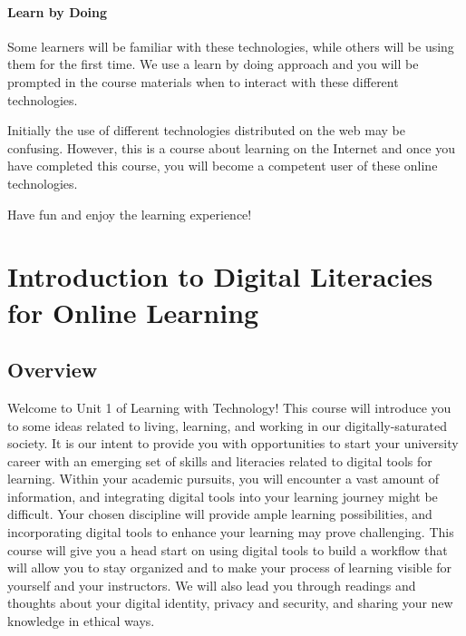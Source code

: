 \documentclass[
]{book}
\theoremstyle{definition}
\theoremstyle{definition}
\theoremstyle{definition}
\theoremstyle{definition}
\theoremstyle{remark}
\begin{document}
\hypertarget{learn-by-doing}{%
\subsubsection*{Learn by Doing}\label{learn-by-doing}}

Some learners will be familiar with these technologies, while others will be using them for the first time. We use a learn by doing approach and you will be prompted in the course materials when to interact with these different technologies.

Initially the use of different technologies distributed on the web may be confusing. However, this is a course about learning on the Internet and once you have completed this course, you will become a competent user of these online technologies.

Have fun and enjoy the learning experience!

\hypertarget{introduction-to-digital-literacies-for-online-learning}{%
\chapter{Introduction to Digital Literacies for Online Learning}\label{introduction-to-digital-literacies-for-online-learning}}

\hypertarget{overview}{%
\section*{Overview}\label{overview}}

Welcome to Unit 1 of Learning with Technology! This course will introduce you to some ideas related to living, learning, and working in our digitally-saturated society. It is our intent to provide you with opportunities to start your university career with an emerging set of skills and literacies related to digital tools for learning. Within your academic pursuits, you will encounter a vast amount of information, and integrating digital tools into your learning journey might be difficult. Your chosen discipline will provide ample learning possibilities, and incorporating digital tools to enhance your learning may prove challenging. This course will give you a head start on using digital tools to build a workflow that will allow you to stay organized and to make your process of learning visible for yourself and your instructors. We will also lead you through readings and thoughts about your digital identity, privacy and security, and sharing your new knowledge in ethical ways.
\end{document}
